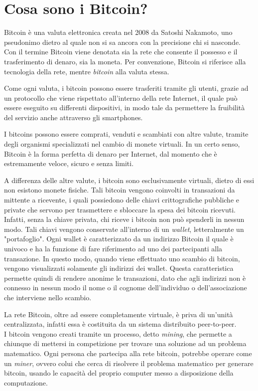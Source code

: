 \section{Cosa sono i Bitcoin?}

Bitcoin è una valuta elettronica creata nel 2008 da Satoshi Nakamoto, uno pseudonimo dietro al quale non si sa ancora con la precisione chi si nasconde.
Con il termine Bitcoin viene denotata sia la rete che consente il possesso e il trasferimento di denaro, sia la moneta. Per convenzione, Bitcoin si riferisce alla tecnologia della rete, mentre \textit{bitcoin} alla valuta stessa.\cite{wiki:bitcoin}

Come ogni valuta, i bitcoin possono essere trasferiti tramite gli utenti, grazie ad un protocollo che viene rispettato all'interno della rete Internet, il quale può essere eseguito su differenti dispositivi, in modo tale da permettere la fruibilità del servizio anche attraverso gli smartphones.
 
I bitcoins possono essere comprati, venduti e scambiati con altre valute, tramite degli organismi specializzati nel cambio di monete virtuali. In un certo senso, Bitcoin è la forma perfetta di denaro per Internet, dal momento che è estremamente veloce, sicuro e senza limiti.

A differenza delle altre valute, i bitcoin sono esclusivamente virtuali, dietro di essi non esistono monete fisiche. Tali bitcoin vengono coinvolti in transazioni da mittente a ricevente, i quali possiedono delle chiavi crittografiche pubbliche e private che servono per trasmettere e sbloccare la spesa dei bitcoin ricevuti.
Infatti, senza la chiave privata, chi riceve i bitcoin non può spenderli in nessun modo. Tali chiavi vengono conservate all'interno di un \textit{wallet}, letteralmente un "portafoglio". Ogni wallet è caratterizzato da un indirizzo Bitcoin il quale è univoco e ha la funzione di fare riferimento ad uno dei partecipanti alla transazione. In questo modo, quando viene effettuato uno scambio di bitcoin, vengono visualizzati solamente gli indirizzi dei wallet. Questa caratteristica permette quindi di rendere anonime le transazioni, dato che agli indirizzi non è connesso in nessun modo il nome o il cognome dell'individuo o dell'associazione che interviene nello scambio.

La rete Bitcoin, oltre ad essere completamente virtuale, è priva di un'unità centralizzata, infatti essa è costituita da un sistema distribuito peer-to-peer.\\
I bitcoin vengono creati tramite un processo, detto \textit{mining}, che permette a chiunque di mettersi in competizione per trovare una soluzione ad un problema matematico. Ogni persona che partecipa alla rete bitcoin, potrebbe operare come un \textit{miner}, ovvero colui che cerca di risolvere il problema matematico per generare bitcoin, usando le capacità del proprio computer messo a disposizione della computazione.\cite{antonopoulos2014mastering}\\


